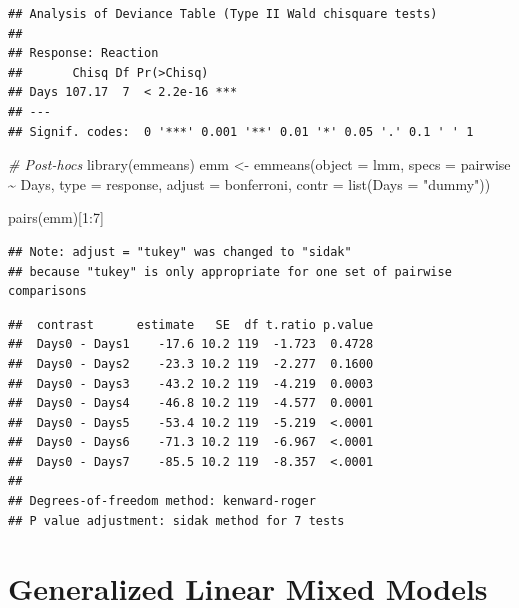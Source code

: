 \documentclass[
]{book}
\newenvironment{Shaded}{\begin{snugshade}}{\end{snugshade}}
\newcommand{\AttributeTok}[1]{\textcolor[rgb]{0.77,0.63,0.00}{#1}}
\newcommand{\CommentTok}[1]{\textcolor[rgb]{0.56,0.35,0.01}{\textit{#1}}}
\newcommand{\DecValTok}[1]{\textcolor[rgb]{0.00,0.00,0.81}{#1}}
\newcommand{\FunctionTok}[1]{\textcolor[rgb]{0.00,0.00,0.00}{#1}}
\newcommand{\NormalTok}[1]{#1}
\newcommand{\OtherTok}[1]{\textcolor[rgb]{0.56,0.35,0.01}{#1}}
\newcommand{\SpecialCharTok}[1]{\textcolor[rgb]{0.00,0.00,0.00}{#1}}
\newcommand{\StringTok}[1]{\textcolor[rgb]{0.31,0.60,0.02}{#1}}
\begin{document}
\begin{verbatim}
## Analysis of Deviance Table (Type II Wald chisquare tests)
## 
## Response: Reaction
##       Chisq Df Pr(>Chisq)    
## Days 107.17  7  < 2.2e-16 ***
## ---
## Signif. codes:  0 '***' 0.001 '**' 0.01 '*' 0.05 '.' 0.1 ' ' 1
\end{verbatim}

\begin{Shaded}
\begin{Highlighting}[]
\CommentTok{\# Post{-}hocs}
\FunctionTok{library}\NormalTok{(emmeans)}
\NormalTok{emm }\OtherTok{\textless{}{-}} \FunctionTok{emmeans}\NormalTok{(}\AttributeTok{object =}\NormalTok{ lmm,}
                     \AttributeTok{specs =}\NormalTok{ pairwise }\SpecialCharTok{\textasciitilde{}}\NormalTok{ Days,}
                     \AttributeTok{type =} \StringTok{\textquotesingle{}response\textquotesingle{}}\NormalTok{,}
                     \AttributeTok{adjust =} \StringTok{\textquotesingle{}bonferroni\textquotesingle{}}\NormalTok{, }
               \AttributeTok{contr =} \FunctionTok{list}\NormalTok{(}\AttributeTok{Days =} \StringTok{"dummy"}\NormalTok{))}


\FunctionTok{pairs}\NormalTok{(emm)[}\DecValTok{1}\SpecialCharTok{:}\DecValTok{7}\NormalTok{]}
\end{Highlighting}
\end{Shaded}

\begin{verbatim}
## Note: adjust = "tukey" was changed to "sidak"
## because "tukey" is only appropriate for one set of pairwise comparisons
\end{verbatim}

\begin{verbatim}
##  contrast      estimate   SE  df t.ratio p.value
##  Days0 - Days1    -17.6 10.2 119  -1.723  0.4728
##  Days0 - Days2    -23.3 10.2 119  -2.277  0.1600
##  Days0 - Days3    -43.2 10.2 119  -4.219  0.0003
##  Days0 - Days4    -46.8 10.2 119  -4.577  0.0001
##  Days0 - Days5    -53.4 10.2 119  -5.219  <.0001
##  Days0 - Days6    -71.3 10.2 119  -6.967  <.0001
##  Days0 - Days7    -85.5 10.2 119  -8.357  <.0001
## 
## Degrees-of-freedom method: kenward-roger 
## P value adjustment: sidak method for 7 tests
\end{verbatim}

\hypertarget{generalized-linear-mixed-models}{%
\section{Generalized Linear Mixed Models}\label{generalized-linear-mixed-models}}
\end{document}
